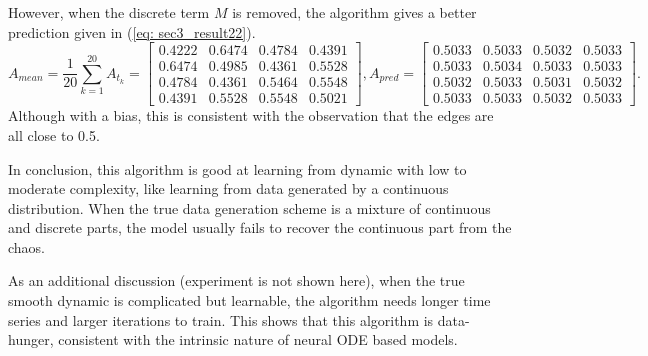 However, when the discrete term $M$ is removed, 
the algorithm gives a better prediction given in (\ref{eq: sec3_result22}). 
\begin{equation}
    \label{eq: sec3_result22}
    A_{mean}=\frac{1}{20}\sum_{k=1}^{20}A_{t_k}=\begin{bmatrix}
        0.4222& 0.6474& 0.4784& 0.4391 \\
        0.6474& 0.4985& 0.4361& 0.5528 \\
        0.4784& 0.4361& 0.5464& 0.5548 \\
        0.4391& 0.5528& 0.5548& 0.5021
    \end{bmatrix}, 
    A_{pred}=\begin{bmatrix}
        0.5033& 0.5033& 0.5032& 0.5033 \\
        0.5033& 0.5034& 0.5033& 0.5033 \\
        0.5032& 0.5033& 0.5031& 0.5032 \\
        0.5033& 0.5033& 0.5032& 0.5033
    \end{bmatrix}.
\end{equation}
Although with a bias, this is consistent with the observation that the edges are all close to 0.5. 

In conclusion, this algorithm is good at learning from dynamic with low to moderate complexity,
like learning from data generated by a continuous distribution. 
When the true data generation scheme is a mixture of continuous and discrete parts, 
the model usually fails to recover the continuous part from the chaos. 

As an additional discussion (experiment is not shown here), when the true smooth dynamic is complicated but learnable, 
the algorithm needs longer time series and larger iterations to train. 
This shows that this algorithm is data-hunger, 
consistent with the intrinsic nature of neural ODE based models.